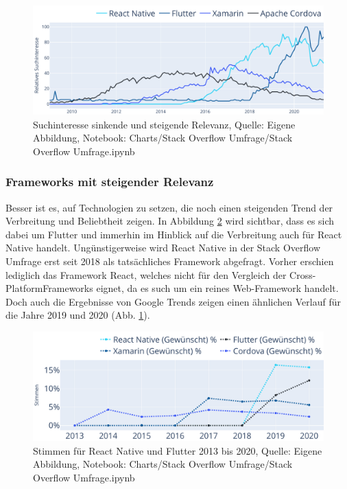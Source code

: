 \begin{figure}[H]
	\centering
    \includegraphics[width=1.0\textwidth]{Charts/Google Trends/Suchinteresse sinkende und steigende Relevanz.pdf}
	\caption[Suchinteresse sinkende und steigende Relevanz]{Suchinteresse sinkende und steigende Relevanz, Quelle: Eigene Abbildung, Notebook: Charts/Stack Overflow Umfrage/Stack Overflow Umfrage.ipynb}
	\label{fig:SuchinteresseSinkendeUndSteigendeRelevanz}
\end{figure}

\subsubsection{Frameworks mit steigender Relevanz}

Besser ist es, auf Technologien zu setzen, die noch einen steigenden Trend der Verbreitung und Beliebtheit zeigen. In Abbildung \ref{fig:ReactNativeUndFlutterStimmen} wird sichtbar, dass es sich dabei um Flutter und immerhin im Hinblick auf die Verbreitung auch für React Native handelt. Ungünstigerweise wird React Native in der Stack Overflow Umfrage erst seit 2018 als tatsächliches Framework abgefragt. Vorher erschien lediglich das Framework React, welches nicht für den Vergleich der Cross-PlatformFrameworks eignet, da es such um ein reines Web-Framework handelt. Doch auch die Ergebnisse von Google Trends zeigen einen ähnlichen Verlauf für die Jahre 2019 und 2020 (Abb. \ref{fig:SuchinteresseSinkendeUndSteigendeRelevanz}).

\begin{figure}[H]
	\centering
    \includegraphics[width=1.0\textwidth]{Charts/Stack Overflow Umfrage/React Native und Flutter Stimmen.pdf}
	\caption[Stimmen für React Native und Flutter]{Stimmen für React Native und Flutter 2013 bis 2020, Quelle: Eigene Abbildung, Notebook: Charts/Stack Overflow Umfrage/Stack Overflow Umfrage.ipynb}
	\label{fig:ReactNativeUndFlutterStimmen}
\end{figure}

